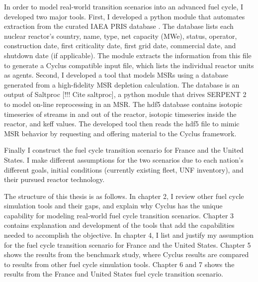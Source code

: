 In order to model real-world transition scenarios into an advanced
fuel cycle, I developed two major tools. First, I developed a python
module that automates extraction from the curated \gls{IAEA} \gls{PRIS} database
\cite{iaea_nuclear_2018}. The database lists each nuclear reactor's
country, name, type, net capacity (\gls{MWe}), status, operator, construction
date, first criticality date, first grid date, commercial date, and shutdown
date (if applicable). The module extracts the information from this file
to generate a Cyclus compatible input file, which lists the individual
reactor units as agents. Second, I developed a tool that models \glspl{MSR}
using a database generated from a high-fidelity \gls{MSR} depletion calculation.
The database is an output of Saltproc [!!! Cite saltproc], a python
module that drives
SERPENT 2 \cite{leppanen_serpentcontinuous-energy_2013} to model on-line reprocessing in an \gls{MSR}.
The hdf5 database contains isotopic timeseries of streams in and out of the reactor,
isotopic timeseries inside the reactor, and keff values. The developed tool then
reads the hdf5 file to mimic \gls{MSR} behavior by requesting and offering
material to the Cyclus framework.

Finally I construct the fuel cycle transition scenario for France and the United States.
I make different assumptions for the two scenarios due to each nation's different goals,
initial conditions (currently existing fleet, \gls{UNF} inventory), and their pursued reactor
technology.

The structure of this thesis is as follows. In chapter 2, I review other fuel cycle simulation
tools and their gaps, and explain why Cyclus
has the unique capability for modeling real-world fuel cycle transition scenarios.
Chapter 3 contains explanation and development of the tools that add the 
capabilities needed to accomplish the objective.
In chapter 4, I list and justify my assumption for the fuel cycle transition
scenario for France and the United States.
Chapter 5 shows the results from the benchmark study, where Cyclus results are compared
to results from other fuel cycle simulation tools.
Chapter 6 and 7 shows the results from the France and United States fuel cycle transition
scenario.

